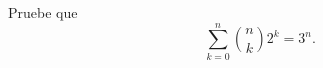 \begin{statement}{6}
  Pruebe que
  \[
    \sum_{k = 0}^n \binom{n}{k} 2^k = 3^n.  
  \]
\end{statement}